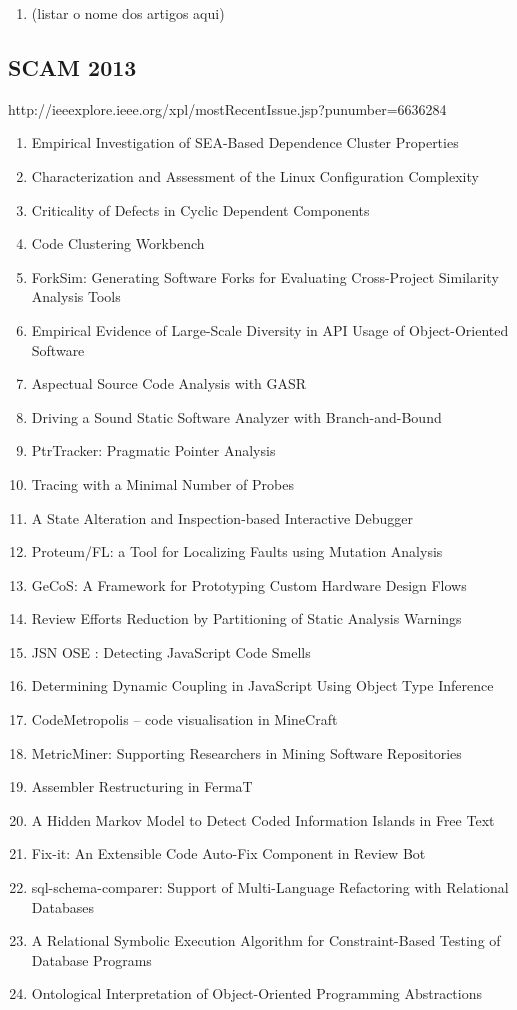\begin{enumerate}[itemsep=-1ex]
  \item (listar o nome dos artigos aqui)
\end{enumerate}

\subsection{SCAM 2013}

http://ieeexplore.ieee.org/xpl/mostRecentIssue.jsp?punumber=6636284

\begin{enumerate}[itemsep=-1ex]
  \item Empirical Investigation of SEA-Based Dependence Cluster Properties
  \item Characterization and Assessment of the Linux Configuration Complexity
  \item Criticality of Defects in Cyclic Dependent Components
  \item Code Clustering Workbench
  \item ForkSim: Generating Software Forks for Evaluating Cross-Project Similarity Analysis Tools
  \item Empirical Evidence of Large-Scale Diversity in API Usage of Object-Oriented Software
  \item Aspectual Source Code Analysis with GASR
  \item Driving a Sound Static Software Analyzer with Branch-and-Bound
  \item PtrTracker: Pragmatic Pointer Analysis
  \item Tracing with a Minimal Number of Probes
  \item A State Alteration and Inspection-based Interactive Debugger
  \item Proteum/FL: a Tool for Localizing Faults using Mutation Analysis
  \item GeCoS: A Framework for Prototyping Custom Hardware Design Flows
  \item Review Efforts Reduction by Partitioning of Static Analysis Warnings
  \item JSN OSE : Detecting JavaScript Code Smells
  \item Determining Dynamic Coupling in JavaScript Using Object Type Inference
  \item CodeMetropolis – code visualisation in MineCraft
  \item MetricMiner: Supporting Researchers in Mining Software Repositories
  \item Assembler Restructuring in FermaT
  \item A Hidden Markov Model to Detect Coded Information Islands in Free Text
  \item Fix-it: An Extensible Code Auto-Fix Component in Review Bot
  \item sql-schema-comparer: Support of Multi-Language Refactoring with Relational Databases
  \item A Relational Symbolic Execution Algorithm for Constraint-Based Testing of Database Programs
  \item Ontological Interpretation of Object-Oriented Programming Abstractions
\end{enumerate}

